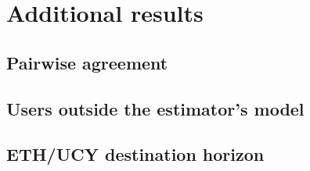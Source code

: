 \section{Additional results}

\subsection{Pairwise agreement}


\subsection{Users outside the estimator's model}


\subsection{ETH/UCY destination horizon}
\label{app:eth_dest}

